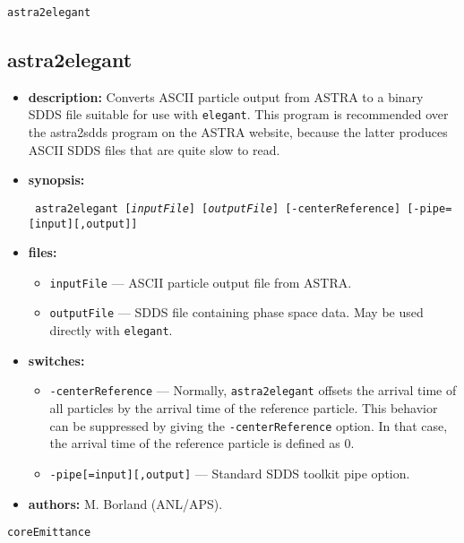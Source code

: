 \documentclass[11pt]{article}
\begin{document}
\newpage
\begin{center}{\Large\verb|astra2elegant|}\end{center}
\subsection{astra2elegant}

\begin{itemize}
\item {\bf description:}   Converts ASCII particle output from ASTRA to a binary
SDDS file suitable for use with {\tt elegant}.  This program is recommended over
the astra2sdds program on the ASTRA website, because the latter produces ASCII SDDS
files that are quite slow to read.

\item {\bf synopsis:}
\begin{flushleft}{\tt
astra2elegant [{\em inputFile}] [{\em outputFile}] [-centerReference] [-pipe=[input][,output]]
}\end{flushleft}

\item {\bf files:}
\begin{itemize}
\item {\tt inputFile} --- ASCII particle output file from ASTRA.
\item {\tt outputFile} --- SDDS file containing phase space data. May be used directly with 
{\tt elegant}.
\end{itemize}

\item {\bf switches:}
\begin{itemize}
\item {\tt -centerReference} --- Normally, {\tt astra2elegant} offsets the arrival time of all particles
  by the arrival time of the reference particle.  This behavior can be suppressed by giving the
  {\tt -centerReference} option.  In that case, the arrival time of the reference particle is defined
  as 0.
\item {\tt -pipe[=input][,output]} --- Standard SDDS toolkit pipe option.
\end{itemize}

\item {\bf authors:} M. Borland (ANL/APS).

\end{itemize}

\newpage
\begin{center}{\Large\verb|coreEmittance|}\end{center}
\end{document}
